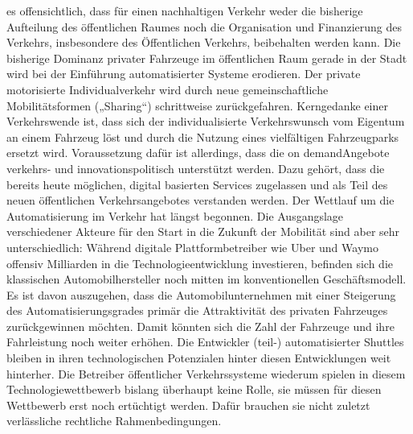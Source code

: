 es offensichtlich, dass für einen nachhaltigen Verkehr weder die bisherige Aufteilung des öffentlichen Raumes noch die Organisation und Finanzierung des Verkehrs, insbesondere
des Öffentlichen Verkehrs, beibehalten werden kann. Die bisherige Dominanz privater Fahrzeuge im
öffentlichen Raum gerade in der Stadt wird bei der Einführung automatisierter Systeme erodieren.
Der private motorisierte Individualverkehr wird durch neue gemeinschaftliche Mobilitätsformen
(„Sharing“) schrittweise zurückgefahren.
Kerngedanke einer Verkehrswende ist, dass sich der individualisierte Verkehrswunsch vom Eigentum an einem Fahrzeug löst und durch die Nutzung eines vielfältigen Fahrzeugparks ersetzt wird.
Voraussetzung dafür ist allerdings, dass die on demandAngebote verkehrs- und innovationspolitisch unterstützt werden.
Dazu gehört, dass die bereits heute möglichen, digital basierten Services zugelassen und als Teil des neuen öffentlichen Verkehrsangebotes verstanden werden.
Der Wettlauf um die Automatisierung im Verkehr hat längst begonnen. Die Ausgangslage verschiedener Akteure für den Start in die Zukunft der Mobilität sind aber sehr unterschiedlich: Während
digitale Plattformbetreiber wie Uber und Waymo offensiv Milliarden in die Technologieentwicklung
investieren, befinden sich die klassischen Automobilhersteller noch mitten im konventionellen Geschäftsmodell. Es ist davon auszugehen, dass die Automobilunternehmen mit einer Steigerung des
Automatisierungsgrades primär die Attraktivität des privaten Fahrzeuges zurückgewinnen möchten.
Damit könnten sich die Zahl der Fahrzeuge und ihre Fahrleistung noch weiter erhöhen. Die Entwickler
(teil-) automatisierter Shuttles bleiben in ihren technologischen Potenzialen hinter diesen Entwicklungen weit hinterher.
Die Betreiber öffentlicher Verkehrssysteme wiederum spielen in diesem Technologiewettbewerb
bislang überhaupt keine Rolle, sie müssen für diesen Wettbewerb erst noch ertüchtigt werden. Dafür
brauchen sie nicht zuletzt verlässliche rechtliche Rahmenbedingungen.
